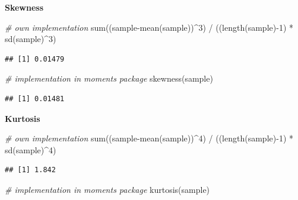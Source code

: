 \documentclass[
  12pt,
]{style/krantz}
\newenvironment{Shaded}{\begin{snugshade}}{\end{snugshade}}
\newcommand{\CommentTok}[1]{\textcolor[rgb]{0.56,0.35,0.01}{\textit{#1}}}
\newcommand{\DecValTok}[1]{\textcolor[rgb]{0.00,0.00,0.81}{#1}}
\newcommand{\FunctionTok}[1]{\textcolor[rgb]{0.00,0.00,0.00}{#1}}
\newcommand{\NormalTok}[1]{#1}
\newcommand{\SpecialCharTok}[1]{\textcolor[rgb]{0.00,0.00,0.00}{#1}}
\begin{document}
\textbf{Skewness}

\begin{Shaded}
\begin{Highlighting}[]
\CommentTok{\# own implementation}
\FunctionTok{sum}\NormalTok{((sample}\SpecialCharTok{{-}}\FunctionTok{mean}\NormalTok{(sample))}\SpecialCharTok{\^{}}\DecValTok{3}\NormalTok{) }\SpecialCharTok{/}\NormalTok{ ((}\FunctionTok{length}\NormalTok{(sample)}\SpecialCharTok{{-}}\DecValTok{1}\NormalTok{) }\SpecialCharTok{*} \FunctionTok{sd}\NormalTok{(sample)}\SpecialCharTok{\^{}}\DecValTok{3}\NormalTok{)}
\end{Highlighting}
\end{Shaded}

\begin{verbatim}
## [1] 0.01479
\end{verbatim}

\begin{Shaded}
\begin{Highlighting}[]
\CommentTok{\# implementation in moments package}
\FunctionTok{skewness}\NormalTok{(sample)}
\end{Highlighting}
\end{Shaded}

\begin{verbatim}
## [1] 0.01481
\end{verbatim}

\textbf{Kurtosis}

\begin{Shaded}
\begin{Highlighting}[]
\CommentTok{\# own implementation}
\FunctionTok{sum}\NormalTok{((sample}\SpecialCharTok{{-}}\FunctionTok{mean}\NormalTok{(sample))}\SpecialCharTok{\^{}}\DecValTok{4}\NormalTok{) }\SpecialCharTok{/}\NormalTok{ ((}\FunctionTok{length}\NormalTok{(sample)}\SpecialCharTok{{-}}\DecValTok{1}\NormalTok{) }\SpecialCharTok{*} \FunctionTok{sd}\NormalTok{(sample)}\SpecialCharTok{\^{}}\DecValTok{4}\NormalTok{)}
\end{Highlighting}
\end{Shaded}

\begin{verbatim}
## [1] 1.842
\end{verbatim}

\begin{Shaded}
\begin{Highlighting}[]
\CommentTok{\# implementation in moments package}
\FunctionTok{kurtosis}\NormalTok{(sample)}
\end{Highlighting}
\end{Shaded}
\end{document}
